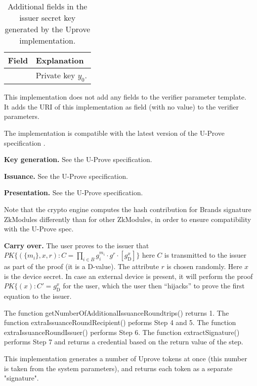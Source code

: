 \begin{description}
\begin{table}[p]
	    \label{tab:isskey:uprove}
	\end{table}
	\begin{table}[p]
	\centering
	    \begin{tabular}{|l|p{}|}\hline
	    \textbf{Field} & \textbf{Explanation} \\\hline
	    \identifier{is:uprove:y0}  & Private key $y_0$.\\\hline
	    \end{tabular}
	    \caption{Additional fields in the issuer secret key generated by the Uprove implementation.}
	    \label{tab:isskey:uprove:sec}
	\end{table}

    This implementation does not add any fields to the verifier
    parameter template. It adds the URI of this implementation as field
    (with no value) to the verifier parameters.

    The implementation is compatible with the latest version of the U-Prove specification \cite{brapaq10}.

    \textbf{Key generation.}
    See the U-Prove specification.

    \textbf{Issuance.}
    See the U-Prove specification.

    \textbf{Presentation.}
    See the U-Prove specification.

    Note that the crypto engine computes the hash contribution for Brands signature ZkModules differently than
    for other ZkModules, in order to ensure compatibility with the U-Prove spec.

    \textbf{Carry over.}
    The user proves to the issuer that
    $\mathit{PK}\lbrace (\lbrace m_i\rbrace, x, r) : C=\prod_{i\in B}g_i^{m_i} \cdot g^r \cdot [g_\textrm{D}^x] \rbrace$
    here $C$ is transmitted to the issuer as part of the proof (it is a D-value).
    The attribute $r$ is chosen randomly. Here $x$ is the device secret.
    In case an external device is present, it will perform the proof
    $\mathit{PK}\lbrace (x): C' = g_\textrm{D}^x$ for the user,
    which the user then ``hijacks'' to prove the first equation to the issuer.

    The function getNumberOfAdditionalIssuanceRoundtrips() returns 1.
    The function extraIssuanceRoundRecipient() peforms Step 4 and 5.
    The function extraIssuanceRoundIssuer() performs Step 6.
    The function extractSignature() performs Step 7 and returns a credential based on the return value of the step.

    This implementation generates a number of Uprove tokens at once (this number is taken
    from the system parameters), and returns each token as a separate "signature".
\end{description}

